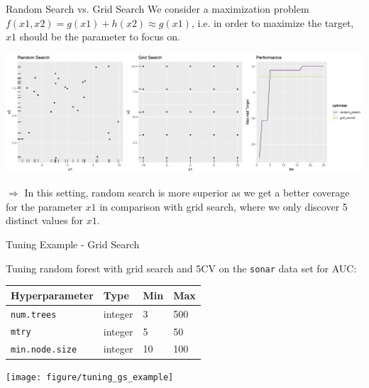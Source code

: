 \begin{vbframe}{Random Search vs. Grid Search}
	We consider a maximization problem $f(x1,x2)=g(x1)+h(x2)\approx g(x1)$, i.e. in order to maximize the target, $x1$ should be the parameter to focus on.
	\vspace{0.5cm}
	\begin{knitrout}\scriptsize
		\color{fgcolor}
		
		{\centering \includegraphics[width=\textwidth]{figure/rs_gs_simulation_plot} 
		}
		
	\end{knitrout}
	$\Rightarrow$ In this setting, random search is more superior as we get a better coverage for the parameter $x1$ in comparison with grid search, where we only discover 5 distinct values for $x1$.
\end{vbframe}

\begin{vbframe}{Tuning Example - Grid Search}
	
	Tuning random forest with grid search and 5CV on the \texttt{sonar} data set for AUC:
	
	\begin{footnotesize}
		\begin{center}
			\begin{tabular}{|l|l|l|l}
				Hyperparameter          &  Type     & Min & Max \\
				\hline
				\texttt{num.trees}     & integer  & 3 & 500 \\
				\texttt{mtry}          & integer  & 5 & 50  \\
				\texttt{min.node.size} & integer  & 10 & 100\\
			\end{tabular}
		\end{center}
	\end{footnotesize}
	
	\begin{knitrout}\scriptsize
		\color{fgcolor}
		
		{\centering \texttt{[image: figure/tuning\_gs\_example]}
		}
		
		
	\end{knitrout}
	
\end{vbframe}

